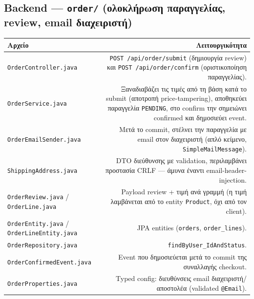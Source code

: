 \documentclass[11pt,a4paper]{article}
\newcommand{\code}[1]{\texttt{#1}}
\begin{document}
\subsection{Backend --- \texttt{order/} (ολοκλήρωση παραγγελίας, review, email διαχειριστή)}
\begin{longtable}{@{}L R@{}}
    \toprule
    \textbf{Αρχείο} & \textbf{Λειτουργικότητα} \\
    \midrule
    \code{OrderController.java} & \code{POST /api/order/submit} (δημιουργία review) και \code{POST /api/order/confirm} (οριστικοποίηση παραγγελίας). \\
    \code{OrderService.java} & Ξαναδιαβάζει τις τιμές από τη βάση κατά το submit (αποτροπή price-tampering), αποθηκεύει παραγγελία \code{PENDING}, στο confirm την σημειώνει confirmed και δημοσιεύει event. \\
    \code{OrderEmailSender.java} & Μετά το commit, στέλνει την παραγγελία με email στον διαχειριστή (απλό κείμενο, \code{SimpleMailMessage}). \\
    \code{ShippingAddress.java} & DTO διεύθυνσης με validation, περιλαμβάνει προστασία CRLF --- άμυνα έναντι email-header-injection. \\
    \code{OrderReview.java} / \code{OrderLine.java} & Payload review + τιμή ανά γραμμή (η τιμή λαμβάνεται από το entity \code{Product}, όχι από τον client). \\
    \code{OrderEntity.java} / \code{OrderLineEntity.java} & JPA entities (\code{orders}, \code{order\_lines}). \\
    \code{OrderRepository.\allowbreak{}java} & \code{findByUser\_IdAndStatus}. \\
    \code{OrderConfirmedEvent.java} & Event που δημοσιεύεται μετά το commit της συναλλαγής checkout. \\
    \code{OrderProperties.java} & Typed config: διευθύνσεις email διαχειριστή/αποστολέα (validated \code{@Email}). \\
    \bottomrule
\end{longtable}
\end{document}
